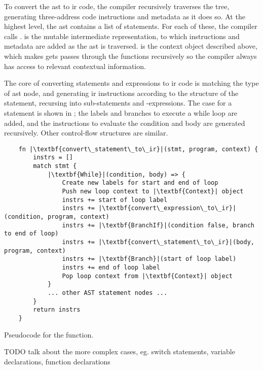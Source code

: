 \documentclass[00-main.tex]{subfiles}
\begin{document}
To convert the \gls{ast} to \gls{ir} code, the compiler recursively traverses the tree, generating three-address code instructions and metadata as it does so.
At the highest level, the \gls{ast} contains a list of statements.
For each of these, the compiler calls .
 is the mutable intermediate representation, to which instructions and metadata are added as the \gls{ast} is traversed.
 is the context object described above, which makes gets passes through the functions recursively so the compiler always has access to relevant contextual information.

The core of converting statements and expressions to \gls{ir} code is matching the type of \gls{ast} node, and generating \gls{ir} instructions according to the structure of the statement, recursing into sub-statements and -expressions.
The case for a  statement is shown in ; the labels and branches to execute a while loop are added, and the instructions to evaluate the condition and body are generated recursively.
Other control-flow structures are similar.

\begin{listing}[!ht]
  \begin{verbatim}
    fn |\textbf{convert\_statement\_to\_ir}|(stmt, program, context) {
        instrs = []
        match stmt {
            |\textbf{While}|(condition, body) => {
                Create new labels for start and end of loop
                Push new loop context to |\textbf{Context}| object
                instrs += start of loop label
                instrs += |\textbf{convert\_expression\_to\_ir}|(condition, program, context)
                instrs += |\textbf{BranchIf}|(condition false, branch to end of loop)
                instrs += |\textbf{convert\_statement\_to\_ir}|(body, program, context)
                instrs += |\textbf{Branch}|(start of loop label)
                instrs += end of loop label
                Pop loop context from |\textbf{Context}| object
            }
            ... other AST statement nodes ...
        }
        return instrs
    }
  \end{verbatim}
  \caption{Pseudocode for the  function.}
  \label{lst:convert while stmt to IR pseudocode}
\end{listing}

\begin{mrwComment}
TODO talk about the more complex cases, eg. switch statements, variable declarations, function declarations
\end{mrwComment}
\end{document}
